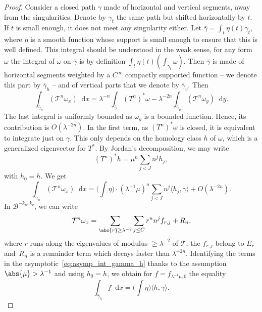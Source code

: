 \documentclass[10pt]{amsart}
\newcommand{\boB}{\mathcal{B}}
\newcommand{\boT}{\mathcal{T}}
\newcommand{\dd}{\mathop{}\!\mathrm{d}}
\newcommand{\paregg}[1]{\biggl(#1\biggr)}
\theoremstyle{definition}
\numberwithin{equation}{section}
\begin{document}
\begin{proof}
Consider a closed path $\gamma$ made of horizontal and vertical segments,
away from the singularities. Denote by $\gamma_t$ the same path but shifted
horizontally by $t$. If $t$ is small enough, it does not meet any singularity
either. Let $\bar\gamma = \int_t \eta(t) \gamma_t$, where $\eta$ is a smooth
function whose support is small enough to ensure that this is well defined.
This integral should be understood in the weak sense, \ie for any form
$\omega$ the integral of $\omega$ on $\bar\gamma$ is by definition $\int_t
\eta(t) (\int_{\gamma_t} \omega)$. Then $\bar \gamma$ is made of horizontal
segments weighted by a $C^\infty$ compactly supported function -- we denote
this part by $\bar\gamma_h$ -- and of vertical parts that we denote by $\bar
\gamma_v$. Then
\begin{equation*}
\int_{\bar \gamma_h} (\boT^n \omega_x) \dd x = \lambda^{-n} \int_{\bar\gamma} (T^n)^* \omega -
\lambda^{-2n} \int_{\bar \gamma_v} (\boT^n \omega_y) \dd y.
\end{equation*}
The last integral is uniformly bounded as $\omega_y$ is a bounded function.
Hence, its contribution is $O(\lambda^{-2n})$. In the first term, as $(T^n)^*
\omega$ is closed, it is equivalent to integrate just on $\gamma$. This only
depends on the homology class $h$ of $\omega$, which is a generalized
eigenvector for $T^*$. By Jordan's decomposition, we may write
\begin{equation*}
(T^n)^* h = \mu^n \sum_{j < J} n^j h_j,
\end{equation*}
with $h_0 = h$. We get
\begin{equation}
\label{eq:asymp_int_gamma_h}
\int_{\bar \gamma_h} (\boT^n \omega_x) \dd x = \paregg{\int \eta} \cdot (\lambda^{-1}\mu)^n \sum_{j< J} n^j \langle h_j, \gamma \rangle + O(\lambda^{-2n}).
\end{equation}
In $\boB^{-k_h, k_v}$, we can write
\begin{equation*}
\boT^n \omega_x =
\sum_{\abs{r}\geq \lambda^{-2}} \sum_{j \leq C} r^n n^j f_{r,j}
+ R_n,
\end{equation*}
where $r$ runs along the eigenvalues of modulus $\geq \lambda^{-2}$ of
$\boT$, the $f_{r,j}$ belong to $E_r$ and~$R_n$ is a remainder term which
decays faster than $\lambda^{-2n}$. Identifying the terms in the
asymptotic~\eqref{eq:asymp_int_gamma_h} thanks to the assumption $\abs{\mu} >
\lambda^{-1}$ and using $h_0= h$, we obtain for $f=f_{\lambda^{-1}\mu,0}$ the
equality
\begin{equation}
\label{eq:bargammah}
\int_{\bar\gamma_h} f \dd x = \paregg{\int \eta} \langle h, \gamma \rangle.
\end{equation}


\end{proof}
\end{document}
